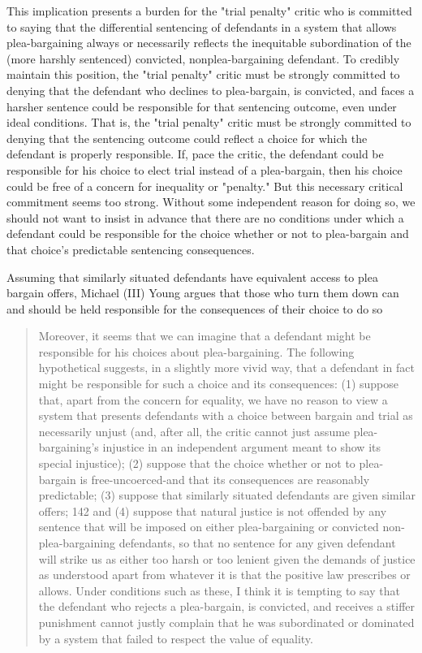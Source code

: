This implication presents a burden for the "trial penalty" critic who is committed to saying that the differential sentencing of defendants in a system that allows plea-bargaining always or necessarily reflects the inequitable subordination of the (more harshly sentenced) convicted, nonplea-bargaining defendant. To credibly maintain this position, the "trial penalty" critic must be strongly committed to denying that the defendant who declines to plea-bargain, is convicted, and faces a harsher sentence could be responsible for that sentencing outcome, even under ideal conditions. That is, the "trial penalty" critic must be strongly committed to denying that the sentencing outcome could reflect a choice for which the defendant is properly responsible. If, pace the critic, the defendant could be responsible for his choice to elect trial instead of a plea-bargain, then his choice could be free of a concern for inequality or "penalty." But this necessary critical commitment seems too strong. Without some independent reason for doing so, we should not want to insist in advance that there are no conditions under which a defendant could be responsible for the choice whether or not to plea-bargain and that choice's predictable sentencing consequences.

Assuming that similarly situated defendants have equivalent access to plea bargain offers, Michael (III) Young argues that those who turn them down can and should be held responsible for the consequences of their choice to do so

\begin{quote}
    Moreover, it seems that we can imagine that a defendant might be responsible for his choices about plea-bargaining. The following hypothetical suggests, in a slightly more vivid way, that a defendant in fact might be responsible for such a choice and its consequences: (1) suppose that, apart from the concern for equality, we have no reason to view a system that presents defendants with a choice between bargain and trial as necessarily unjust (and, after all, the critic cannot just assume plea-bargaining's injustice in an independent argument meant to show its special injustice); (2) suppose that the choice whether or not to plea-bargain is free-uncoerced-and that its consequences are reasonably predictable; (3) suppose that similarly situated defendants are given similar offers; 142 and (4) suppose that natural justice is not offended by any sentence that will be imposed on either plea-bargaining or convicted non-plea-bargaining defendants, so that no sentence for any given defendant will strike us as either too harsh or too lenient given the demands of justice as understood apart from whatever it is that the positive law prescribes or allows. Under conditions such as these, I think it is tempting to say that the defendant who rejects a plea-bargain, is convicted, and receives a stiffer punishment cannot justly complain that he was subordinated or dominated by a system that failed to respect the value of equality.
\end{quote}

